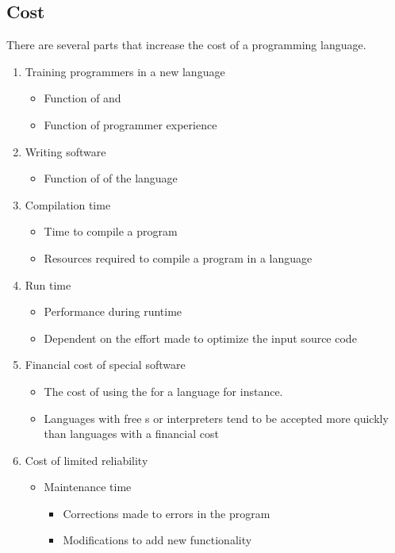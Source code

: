 \subsection{Cost}\label{subsec:Cost}
There are several parts that increase the cost of a programming language.
\begin{enumerate}[noitemsep]
\item Training programmers in a new language
  \begin{itemize}[noitemsep]
  \item Function of  and 
  \item Function of programmer experience
  \end{itemize}
  
\item Writing software
  \begin{itemize}[noitemsep]
  \item Function of  of the language
  \end{itemize}
  
\item Compilation time
  \begin{itemize}[noitemsep]
  \item Time to compile a program
  \item Resources required to compile a program in a language
  \end{itemize}

\item Run time
  \begin{itemize}[noitemsep]
  \item Performance during runtime
  \item Dependent on the effort made to optimize the input source code
  \end{itemize}

\item Financial cost of special software
  \begin{itemize}[noitemsep]
  \item The cost of using the  for a language for instance.
  \item Languages with free s or interpreters tend to be accepted more quickly than languages with a financial cost
  \end{itemize}

\item Cost of limited reliability
  \begin{itemize}[noitemsep]
  \item Maintenance time
    \begin{itemize}[noitemsep]
    \item Corrections made to errors in the program
    \item Modifications to add new functionality
    \end{itemize}


\end{itemize}
\end{enumerate}
